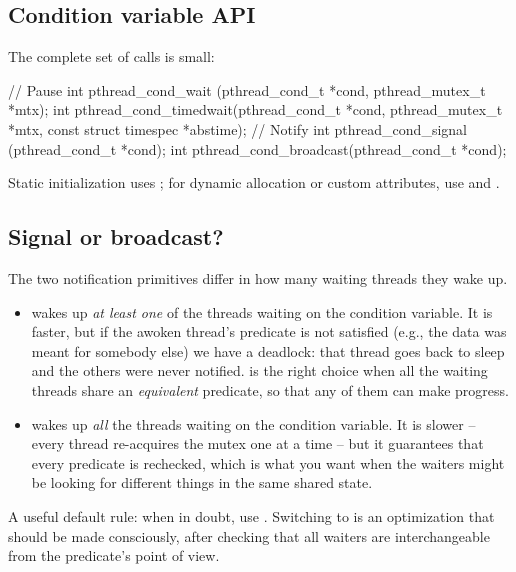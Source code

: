 \subsection{Condition variable API}

The complete set of calls is small:

\begin{codeblock}[language=C, numbers=none]
// Pause
int pthread_cond_wait     (pthread_cond_t *cond, pthread_mutex_t *mtx);
int pthread_cond_timedwait(pthread_cond_t *cond, pthread_mutex_t *mtx,
                           const struct timespec *abstime);
// Notify
int pthread_cond_signal   (pthread_cond_t *cond);
int pthread_cond_broadcast(pthread_cond_t *cond);
\end{codeblock}

Static initialization uses ; for dynamic allocation or custom attributes, use  and .

\subsection{Signal or broadcast?}

The two notification primitives differ in how many waiting threads they wake up.

\begin{itemize}
    \item {} wakes up \emph{at least one} of the threads waiting on the condition variable. It is faster, but if the awoken thread's predicate is not satisfied (e.g., the data was meant for somebody else) we have a deadlock: that thread goes back to sleep and the others were never notified.  is the right choice when all the waiting threads share an \emph{equivalent} predicate, so that any of them can make progress.
    \item {} wakes up \emph{all} the threads waiting on the condition variable. It is slower -- every thread re-acquires the mutex one at a time -- but it guarantees that every predicate is rechecked, which is what you want when the waiters might be looking for different things in the same shared state.
\end{itemize}

A useful default rule: when in doubt, use . Switching to  is an optimization that should be made consciously, after checking that all waiters are interchangeable from the predicate's point of view.
